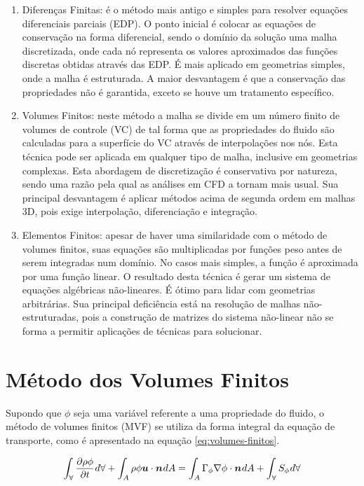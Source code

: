 \begin{enumerate}
    \item Diferenças Finitas: é o método mais antigo e simples para resolver equações diferenciais parciais (EDP). O ponto inicial é colocar as equações de conservação na forma diferencial, sendo o domínio da solução uma malha discretizada, onde cada nó representa os valores aproximados das funções discretas obtidas através das EDP. É mais aplicado em geometrias simples, onde a malha é estruturada. A maior desvantagem é que a conservação das propriedades não é garantida, exceto se houve um tratamento específico.
    \item Volumes Finitos: neste método a malha se divide em um número finito de volumes de controle (VC) de tal forma que as propriedades do fluido são calculadas para a superfície do VC através de interpolações nos nós. Esta técnica pode ser aplicada em qualquer tipo de malha, inclusive em geometrias complexas. Esta abordagem de discretização é conservativa por natureza, sendo uma razão pela qual as análises em CFD a tornam mais usual. Sua principal desvantagem é aplicar métodos acima de segunda ordem em malhas 3D, pois exige interpolação, diferenciação e integração.
    \item Elementos Finitos: apesar de haver uma similaridade com o método de volumes finitos, suas equações são multiplicadas por funções peso antes de serem integradas num domínio. No casos mais simples, a função é aproximada por uma função linear. O resultado desta técnica é gerar um sistema de equações algébricas não-lineares. É ótimo para lidar com geometrias arbitrárias. Sua principal deficiência está na resolução de malhas não-estruturadas, pois a construção de matrizes do sistema não-linear não se forma a permitir aplicações de técnicas para solucionar.
\end{enumerate}

\section{Método dos Volumes Finitos}

Supondo que \(\phi\) seja uma variável referente a uma propriedade do fluido, o método de volumes finitos (MVF) se utiliza da forma integral da equação de transporte, como é apresentado na equação \ref{eq:volumes-finitos}.

\begin{equation}
    \label{eq:volumes-finitos}
    \int_{\forall} \frac{\partial \rho\phi}{\partial t} \hspace{0.5pt} d\forall + \int_{A} \rho\phi\boldsymbol{u}\cdot\boldsymbol{n}\hspace{0.5pt} dA = \int_{A} \Gamma_{\phi}\nabla\phi\cdot\boldsymbol{n}\hspace{0.5pt} dA + \int_{\forall} S_{\phi}\hspace{0.5pt} d\forall
\end{equation}

